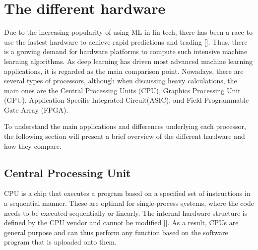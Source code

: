 \iffalse
Artificial neural networks have especially gotten popular in the financial-technology (fin-tech) area to handle data and help predict future changes in the stock market. But due to massive incoming data and fast transactions, the interest in looking into other alternatives on implementing their algorithms has grown. However, the FPGA is not ideal for replacing all processors, but it could help optimize the latency of memory sharing due to its parallelism. In this thesis, we will implement a Feedforward network on an FPGA and look at the performance to see if it is worth replacing hardware parts.
\fi







\section{The different hardware}
Due to the increasing popularity of using ML in fin-tech, there has been a race to use the fastest hardware to achieve rapid predictions and trading  [\cite{FPGAvsGPU}].
Thus, there is a growing demand for hardware platforms to compute such intensive machine learning algorithms. As deep learning has driven most advanced machine learning applications, it is regarded as the main comparison point.
Nowadays, there are several types of processors, although when discussing heavy calculations, the main ones are the Central Processing Units (CPU), Graphics Processing Unit (GPU), Application Specific Integrated Circuit(ASIC), and Field Programmable Gate Array (FPGA). 

To understand the main applications and differences underlying each processor, the following section will present a brief overview of the different hardware and how they compare.

\subsection{Central Processing Unit}
\acrshort{CPU} is a chip that executes a program based on a specified set of instructions in a sequential manner. These are optimal for single-process systems, where the code needs to be executed sequentially or linearly.
The internal hardware structure is defined by the CPU vendor and cannot be modified [\cite{5272532}]. As a result, CPUs are general purpose and can thus perform any function based on the software program that is uploaded onto them.\\

